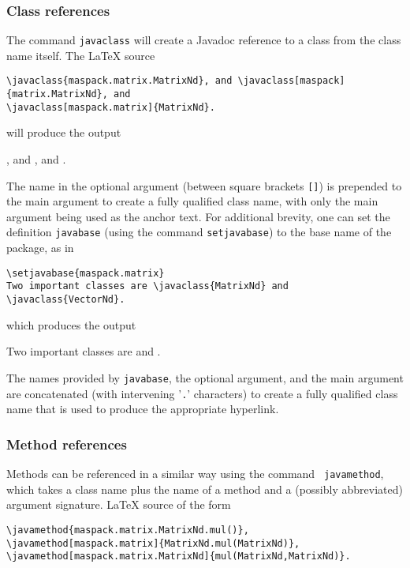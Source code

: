 \documentclass{article}
\begin{document}
\subsubsection{Class references}
\label{ClassRefsSec}

The command {\tt \BKS javaclass} will create a Javadoc reference to 
a class from the class name itself. The LaTeX source

\begin{lstlisting}
\javaclass{maspack.matrix.MatrixNd}, and \javaclass[maspack]{matrix.MatrixNd}, and
\javaclass[maspack.matrix]{MatrixNd}.
\end{lstlisting}

will produce the output

, and , and
.

The name in the optional argument (between square brackets {\tt []})
is prepended to the main argument to create a fully qualified class name,
with only the main argument being used as the anchor text. For
additional brevity, one can set the definition {\tt \BKS javabase}
(using the command {\tt \BKS setjavabase}) to the base name of the
package, as in

\begin{lstlisting}
\setjavabase{maspack.matrix}
Two important classes are \javaclass{MatrixNd} and \javaclass{VectorNd}.
\end{lstlisting}

which produces the output

Two important classes are  and .

The names provided by {\tt \BKS javabase}, the optional argument, and the
main argument are concatenated (with intervening '{\tt .}'
characters) to create a fully qualified class name that is used to
produce the appropriate hyperlink.

\subsubsection{Method references}

Methods can be referenced in a similar way using the command {\tt
\BKS javamethod}, which takes a class name plus the name of a method and
a (possibly abbreviated) argument signature.
LaTeX source of the form

\begin{lstlisting}
\javamethod{maspack.matrix.MatrixNd.mul()}, 
\javamethod[maspack.matrix]{MatrixNd.mul(MatrixNd)},
\javamethod[maspack.matrix.MatrixNd]{mul(MatrixNd,MatrixNd)}.
\end{lstlisting}
\end{document}
